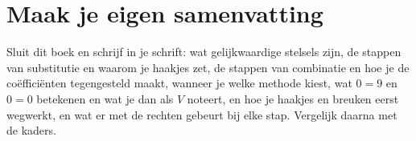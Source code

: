 
\begin{oefeningen}






\end{oefeningen}


\ifzelfstudie
\section*{Maak je eigen samenvatting}
Sluit dit boek en schrijf in je schrift: wat gelijkwaardige stelsels zijn, de stappen van substitutie en waarom je haakjes zet, de stappen van combinatie en hoe je de coëfficiënten tegengesteld maakt, wanneer je welke methode kiest, wat $0 = 9$ en $0 = 0$ betekenen en wat je dan als $V$ noteert, en hoe je haakjes en breuken eerst wegwerkt, en wat er met de rechten gebeurt bij elke stap. Vergelijk daarna met de kaders.
\fi
